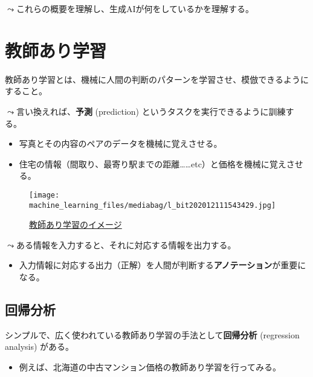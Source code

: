 \documentclass[
  xelatex,
  ja=standard]{bxjsarticle}
\providecommand{\tightlist}{%
  \setlength{\itemsep}{0pt}\setlength{\parskip}{0pt}}\usepackage{longtable,booktabs,array}
\begin{document}
\(\leadsto\)これらの概要を理解し、生成AIが何をしているかを理解する。

\hypertarget{ux6559ux5e2bux3042ux308aux5b66ux7fd2}{%
\section{教師あり学習}\label{ux6559ux5e2bux3042ux308aux5b66ux7fd2}}

教師あり学習とは、機械に人間の判断のパターンを学習させ、模倣できるようにすること。

\(\leadsto\)言い換えれば、\textbf{予測} (prediction)
というタスクを実行できるように訓練する。

\begin{itemize}
\tightlist
\item
  写真とその内容のペアのデータを機械に覚えさせる。
\item
  住宅の情報（間取り、最寄り駅までの距離\ldots\ldots etc）と価格を機械に覚えさせる。
\end{itemize}

\begin{figure}[htpb]

{\centering \texttt{[image: machine\_learning\_files/mediabag/l\_bit202012111543429.jpg]}

}

\caption{\href{https://www.sbbit.jp/article/cont1/49067}{教師あり学習のイメージ}}

\end{figure}

\(\leadsto\)ある情報を入力すると、それに対応する情報を出力する。

\begin{itemize}
\tightlist
\item
  入力情報に対応する出力（正解）を人間が判断する\textbf{アノテーション}が重要になる。
\end{itemize}

\hypertarget{ux56deux5e30ux5206ux6790}{%
\subsection{回帰分析}\label{ux56deux5e30ux5206ux6790}}

シンプルで、広く使われている教師あり学習の手法として\textbf{回帰分析}
(regression analysis) がある。

\begin{itemize}
\tightlist
\item
  例えば、北海道の中古マンション価格の教師あり学習を行ってみる。
\end{itemize}
\end{document}
